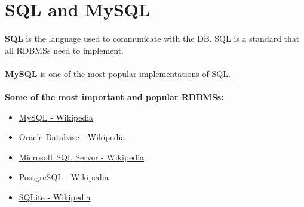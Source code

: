 
\section{\acf{SQL} and My\acs{SQL}}
\label{sec:sql}
\paragraph{} \textbf{\acf{SQL}} is the language used to communicate with the \acl{DB}. \acs{SQL} is a standard that all \acsp{RDBMS} need to implement.
\label{sec:mysql}
\paragraph{} \textbf{My\acs{SQL}} is one of the most popular implementations of \acs{SQL}.
\label{sec:listofrdbms}
\paragraph{} \textbf{Some of the most important and popular \acsp{RDBMS}:}
\begin{itemize}
	\item\href{https://en.wikipedia.org/wiki/MySQL}{My\acs{SQL} - Wikipedia}
	\item\href{https://en.wikipedia.org/wiki/Oracle_Database}{Oracle Database - Wikipedia}
	\item\href{https://en.wikipedia.org/wiki/Microsoft_SQL_Server}{Microsoft \acs{SQL} Server - Wikipedia}
	\item\href{https://en.wikipedia.org/wiki/PostgreSQL}{Postgre\acs{SQL} - Wikipedia}
	\item\href{https://en.wikipedia.org/wiki/SQLite}{\acs{SQL}ite - Wikipedia}
\end{itemize}
